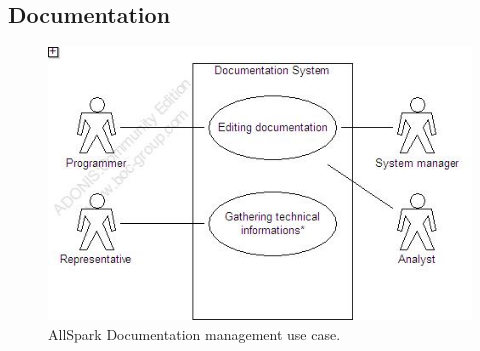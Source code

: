 \subsection{Documentation}
\begin{figure}
\begin{centering}
\includegraphics[scale=0.45]{assign3/adonis/imgs/documentation.jpg}
\caption{AllSpark Documentation management use case.}
\label{2img:[use]documentation}
\end{centering}
\end{figure}